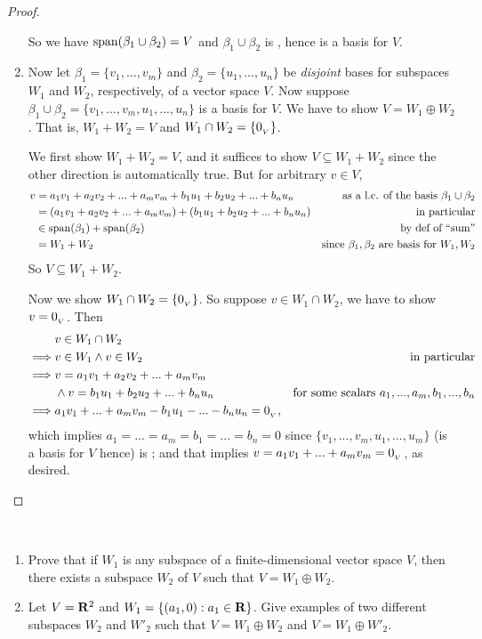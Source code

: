 \begin{proof}
\begin{enumerate}
So we have \(\operatorname{span}(\beta_1 \cup \beta_2) = V\) and \(\beta_1 \cup \beta_2\) is \LID{}, hence is a basis for \(V\).

\item
Now let \(\beta_1 = \{ v_1, ..., v_m \}\) and \(\beta_2 = \{u_1, ..., u_n \}\) be \emph{disjoint} bases for subspaces \(W_1\) and \(W_2\), respectively, of a vector space \(V\).
Now suppose \(\beta_1 \cup \beta_2 = \{ v_1, ..., v_m, u_1, ..., u_n \}\) is a basis for \(V\).
We have to show \(V = W_1 \oplus W_2\).
That is, \(W_1 + W_2 = V\) and \(W_1 \cap W_2 = \{ 0_{_V} \}\).

We first show \(W_1 + W_2 = V\), and it suffices to show \(V \subseteq W_1 + W_2\) since the other direction is automatically true.
But for arbitrary \(v \in V\),
\begin{align*}
    v & = a_1 v_1 + a_2 v_2 + ... + a_m v_m + b_1 u_1 + b_2 u_2 + ... + b_n u_n & \text{as a l.c. of the basis \(\beta_1 \cup \beta_2\)} \\
      & = (a_1 v_1 + a_2 v_2 + ... + a_m v_m) + (b_1 u_1 + b_2 u_2 + ... + b_n u_n) & \text{in particular} \\
      & \in \operatorname{span}(\beta_1) + \operatorname{span}(\beta_2) & \text{by def of ``sum''} \\
      & = W_1 + W_2 & \text{since \(\beta_1, \beta_2\) are basis for \(W_1, W_2\)}
\end{align*}
So \(V \subseteq W_1 + W_2\).

Now we show \(W_1 \cap W_2 = \{ 0_{_V} \}\).
So suppose \(v \in W_1 \cap W_2\), we have to show \(v = 0_{_V}\).
Then
\begin{align*}
             & v \in W_1 \cap W_2 \\
    \implies & v \in W_1 \land v \in W_2 & \text{in particular} \\
    \implies & v = a_1 v_1 + a_2 v_2 + ... + a_m v_m \\
             & \land v = b_1 u_1 + b_2 u_2 + ... + b_n u_n & \text{for some scalars \(a_1, ..., a_m, b_1, ..., b_n\)} \\
    \implies & a_1 v_1 + ... + a_m v_m - b_1 u_1 - ... - b_n u_n = 0_{_V},
\end{align*}
which implies \(a_1 = ... = a_m = b_1 = ... = b_n = 0\) since \(\{v_1, ..., v_m, u_1, ..., u_m\}\) (is a basis for \(V\) hence) is \LID{};
and that implies \(v = a_1 v_1 + ... + a_m v_m = 0_{_V}\), as desired.
\end{enumerate}
\end{proof}

\begin{exercise} \label{exercise 1.6.34}\ 

\begin{enumerate}
\item Prove that if \(W_1\) is any subspace of a finite-dimensional vector space \(V\), then there exists a subspace \(W_2\) of \(V\) such that \(V = W_1 \oplus W_2\).
\item Let \(V = \mathbf{R}^2\) and \(W_1 = \{ (a_1, 0) : a_1 \in \mathbf{R} \}\).
    Give examples of two different subspaces \(W_2\) and \(W'_2\) such that \(V = W_1 \oplus W_2\) and \(V = W_1 \oplus W'_2\).
\end{enumerate}
\end{exercise}

